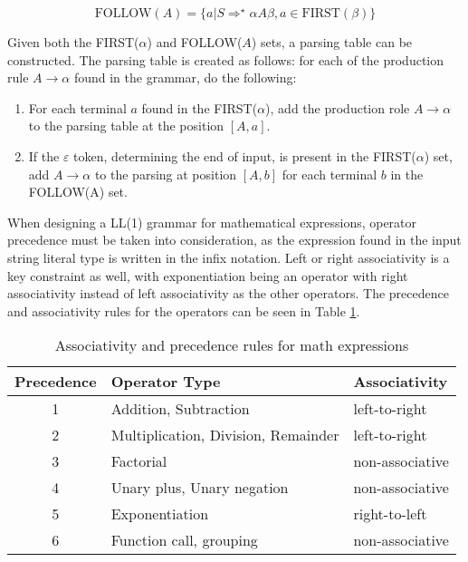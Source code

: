 $$\text{FOLLOW}(A) = \{ a | S \Rightarrow^\star \alpha A\beta, a \in \text{FIRST}(\beta) \} $$

Given both the FIRST($\alpha$) and FOLLOW($A$) sets, a parsing table can be constructed. The parsing table is created as follows: for each of the production rule $A \rightarrow \alpha$ found in the grammar, do the following:

\begin{enumerate}
  \item For each terminal $a$ found in the FIRST($\alpha$), add the production role $A \rightarrow \alpha$ to the parsing table at the position $[A, a]$.
  \item If the $\varepsilon$ token, determining the end of input, is present in the FIRST($\alpha$) set, add $A \rightarrow \alpha$ to the parsing at position $[A, b]$ for each terminal $b$ in the FOLLOW(A) set.
\end{enumerate}

When designing a LL(1) grammar for mathematical expressions, operator precedence must be taken into consideration, as the expression found in the input string literal type is written in the infix notation. Left or right associativity is a key constraint as well, with exponentiation being an operator with right associativity instead of left associativity as the other operators. The precedence and associativity rules for the operators can be seen in Table \ref{table:associativity}.

\begin{table}[ht]
  \centering
  \begin{tabular}{c|l|l}
    \hline
    \textbf{Precedence} & \textbf{Operator Type}              & \textbf{Associativity} \\ \hline
    1                   & Addition, Subtraction               & left-to-right          \\ 
    2                   & Multiplication, Division, Remainder & left-to-right          \\ 
    3                   & Factorial                           & non-associative        \\ 
    4                   & Unary plus, Unary negation          & non-associative        \\ 
    5                   & Exponentiation                      & right-to-left          \\ 
    6                   & Function call, grouping             & non-associative        \\ \hline
  \end{tabular}
  \caption{Associativity and precedence rules for math expressions}
  \label{table:associativity}
\end{table}


